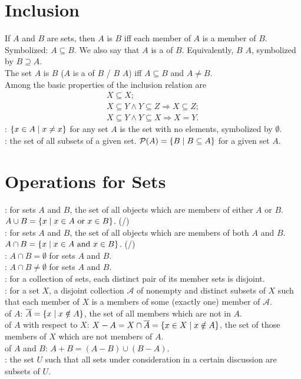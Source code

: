 \documentclass[12pt]{book}
\begin{document}
\section{Inclusion}
If $A$ and $B$ are sets, then $A$ is  $B$ iff each member of $A$ is a member of $B$. Symbolized: $A \subseteq B$. We also say that $A$ is a  of $B$. Equivalently, $B$  $A$, symbolized by $B \supseteq A$.\\ The set $A$ is  $B$ ($A$ is a  of $B$ / $B$  $A$) iff $A \subseteq B$ and $A \neq B$.\\ Among the basic properties of the inclusion relation are
\begin{gather*}
X \subseteq X;\\ X \subseteq Y \wedge Y \subseteq Z \Rightarrow X \subseteq Z;\\ X \subseteq Y \wedge Y \subseteq X \Rightarrow X = Y.
\end{gather*}
: $\{x \in A \mid x \neq x\}$ for any set $A$ is the set with no elements, symbolized by $\emptyset$.\\
: the set of all subsets of a given set. $\mathcal{P}(A) = \{B \mid B \subseteq A\}$ for a given set $A$.

\section{Operations for Sets}
: for sets $A$ and $B$, the set of all objects which are members of either $A$ or $B$. $A \cup B = \{x \mid x \in A \text{ or } x \in B\}$. (/)\\
: for sets $A$ and $B$, the set of all objects which are members of both $A$ and $B$. $A \cap B = \{x \mid x \in A \text{ and } x \in B\}$. (/)\\
: $A \cap B = \emptyset$ for sets $A$ and $B$.\\
: $A \cap B \neq \emptyset$ for sets $A$ and $B$.\\
: for a collection of sets, each distinct pair of its member sets is disjoint.\\
: for a set $X$, a disjoint collection $\mathcal{A}$ of nonempty and distinct subsets of $X$ such that each member of $X$ is a members of some (exactly one) member of $\mathcal{A}$.\\
 of $A$: $\overline{A} = \{x \mid x \notin A\}$, the set of all members which are not in $A$.\\
 of $A$ with respect to $X$: $X - A = X \cap \overline{A} = \{x \in X \mid x \notin A\}$, the set of those members of $X$ which are not members of $A$.\\
 of $A$ and $B$: $A + B = (A - B) \cup (B - A)$.\\
: the set $U$ such that all sets under consideration in a certain discussion are subsets of $U$.\\
\end{document}
